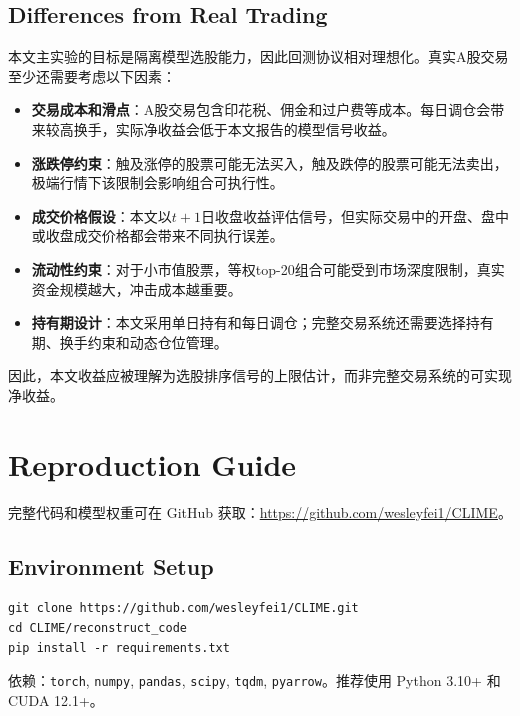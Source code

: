 \subsection{Differences from Real Trading}

本文主实验的目标是隔离模型选股能力，因此回测协议相对理想化。真实A股交易至少还需要考虑以下因素：

\begin{itemize}[leftmargin=*, itemsep=2pt]
    \item \textbf{交易成本和滑点}：A股交易包含印花税、佣金和过户费等成本。每日调仓会带来较高换手，实际净收益会低于本文报告的模型信号收益。
    \item \textbf{涨跌停约束}：触及涨停的股票可能无法买入，触及跌停的股票可能无法卖出，极端行情下该限制会影响组合可执行性。
    \item \textbf{成交价格假设}：本文以$t+1$日收盘收益评估信号，但实际交易中的开盘、盘中或收盘成交价格都会带来不同执行误差。
    \item \textbf{流动性约束}：对于小市值股票，等权top-20组合可能受到市场深度限制，真实资金规模越大，冲击成本越重要。
    \item \textbf{持有期设计}：本文采用单日持有和每日调仓；完整交易系统还需要选择持有期、换手约束和动态仓位管理。
\end{itemize}

因此，本文收益应被理解为选股排序信号的上限估计，而非完整交易系统的可实现净收益。

\section{Reproduction Guide}
\label{sec:appendix_reproduction}

完整代码和模型权重可在 GitHub 获取：\url{https://github.com/wesleyfei1/CLIME}。

\subsection*{Environment Setup}

\begin{verbatim}
git clone https://github.com/wesleyfei1/CLIME.git
cd CLIME/reconstruct_code
pip install -r requirements.txt
\end{verbatim}

依赖：\texttt{torch}, \texttt{numpy}, \texttt{pandas}, \texttt{scipy}, \texttt{tqdm}, \texttt{pyarrow}。推荐使用 Python 3.10+ 和 CUDA 12.1+。

